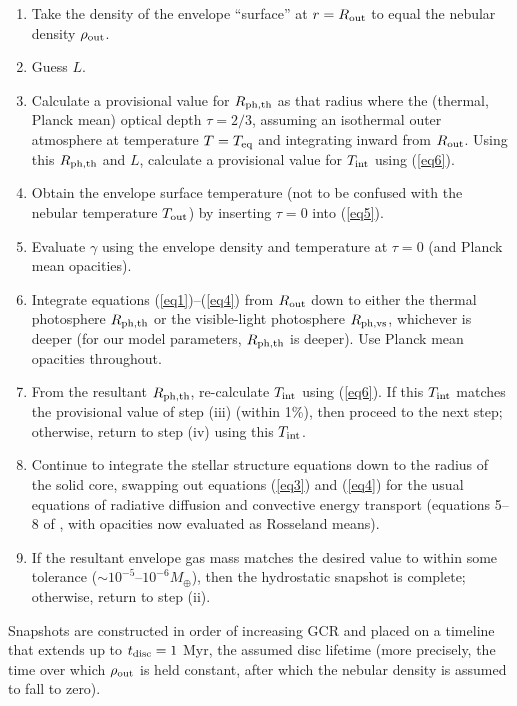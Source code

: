 \documentclass[fleqn,useAMS,usenatbib]{mnras}
\begin{document}
\begin{enumerate}
\item Take the density of the envelope
``surface'' at $r = R_{\rm out}$ to equal the
nebular density $\rho_{\rm out}$.
\item Guess $L$.
\item Calculate a provisional value for
$R_{\rm ph,th}$ as that radius where the
(thermal, Planck mean) optical depth $\tau = 2/3$,
assuming an isothermal outer atmosphere
at temperature $T = T_{\rm eq}$ and integrating inward
from $R_{\rm out}$. Using this $R_{\rm ph,th}$ and $L$, calculate
a provisional value for $T_{\rm int}$ using (\ref{eq6}).
\item Obtain the envelope surface temperature
(not to be confused with the nebular temperature $T_{\rm out}$)
by inserting $\tau=0$ into (\ref{eq5}).
\item Evaluate $\gamma$ using the envelope
density and temperature at $\tau = 0$ (and Planck mean opacities).
\item Integrate equations (\ref{eq1})--(\ref{eq4}) from $R_{\rm out}$ down
to either the thermal photosphere $R_{\rm ph,th}$ or the visible-light
photosphere $R_{\rm ph,vs}$, whichever is deeper
(for our model parameters, $R_{\rm ph,th}$ is deeper).
Use Planck mean opacities throughout.
\item From the resultant $R_{\rm ph,th}$, re-calculate $T_{\rm int}$
using (\ref{eq6}). If this $T_{\rm int}$ matches the provisional
value of step (iii)
(within 1\%), then proceed to the next step; otherwise,
return to step (iv) using this $T_{\rm int}$.
\item Continue to integrate the stellar structure equations
down to the radius of the solid core, swapping out equations (\ref{eq3})
and (\ref{eq4}) for the usual equations of radiative diffusion
and convective energy transport (equations 5--8 of \citealt{paper1},
with opacities now evaluated as Rosseland means).
\item If the resultant envelope gas mass
matches the desired value to within some
tolerance ($\sim$$10^{-5}$--$10^{-6} M_\oplus$),
then the hydrostatic snapshot is complete;
otherwise, return to step (ii).
\end{enumerate}

Snapshots are constructed in order of increasing GCR
and placed on a timeline that extends up to $t_{\rm disc} = 1$ Myr,
the assumed disc lifetime (more precisely,
the time over which $\rho_{\rm out}$ is held constant,
after which the nebular density is assumed to fall to zero).
\end{document}
